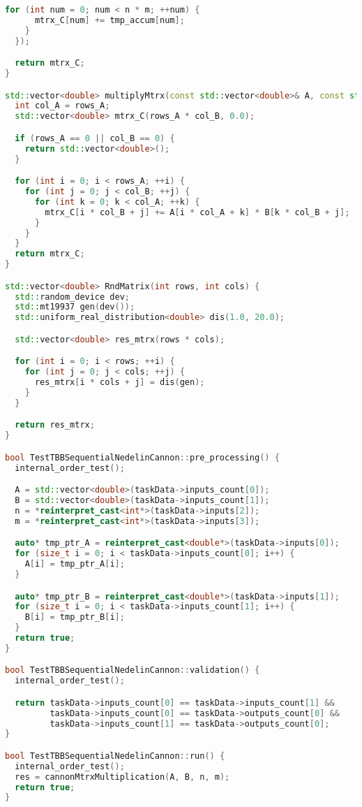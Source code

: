 \documentclass{report}
\begin{document}
\begin{lstlisting}[language=C++,caption=TBB версия]
    for (int num = 0; num < n * m; ++num) {
      mtrx_C[num] += tmp_accum[num];
    }
  });

  return mtrx_C;
}

std::vector<double> multiplyMtrx(const std::vector<double>& A, const std::vector<double>& B, int rows_A, int col_B) {
  int col_A = rows_A;
  std::vector<double> mtrx_C(rows_A * col_B, 0.0);

  if (rows_A == 0 || col_B == 0) {
    return std::vector<double>();
  }

  for (int i = 0; i < rows_A; ++i) {
    for (int j = 0; j < col_B; ++j) {
      for (int k = 0; k < col_A; ++k) {
        mtrx_C[i * col_B + j] += A[i * col_A + k] * B[k * col_B + j];
      }
    }
  }
  return mtrx_C;
}

std::vector<double> RndMatrix(int rows, int cols) {
  std::random_device dev;
  std::mt19937 gen(dev());
  std::uniform_real_distribution<double> dis(1.0, 20.0);

  std::vector<double> res_mtrx(rows * cols);

  for (int i = 0; i < rows; ++i) {
    for (int j = 0; j < cols; ++j) {
      res_mtrx[i * cols + j] = dis(gen);
    }
  }

  return res_mtrx;
}

bool TestTBBSequentialNedelinCannon::pre_processing() {
  internal_order_test();

  A = std::vector<double>(taskData->inputs_count[0]);
  B = std::vector<double>(taskData->inputs_count[1]);
  n = *reinterpret_cast<int*>(taskData->inputs[2]);
  m = *reinterpret_cast<int*>(taskData->inputs[3]);

  auto* tmp_ptr_A = reinterpret_cast<double*>(taskData->inputs[0]);
  for (size_t i = 0; i < taskData->inputs_count[0]; i++) {
    A[i] = tmp_ptr_A[i];
  }

  auto* tmp_ptr_B = reinterpret_cast<double*>(taskData->inputs[1]);
  for (size_t i = 0; i < taskData->inputs_count[1]; i++) {
    B[i] = tmp_ptr_B[i];
  }
  return true;
}

bool TestTBBSequentialNedelinCannon::validation() {
  internal_order_test();

  return taskData->inputs_count[0] == taskData->inputs_count[1] &&
         taskData->inputs_count[0] == taskData->outputs_count[0] &&
         taskData->inputs_count[1] == taskData->outputs_count[0];
}

bool TestTBBSequentialNedelinCannon::run() {
  internal_order_test();
  res = cannonMtrxMultiplication(A, B, n, m);
  return true;
}


\end{lstlisting}
\end{document}
